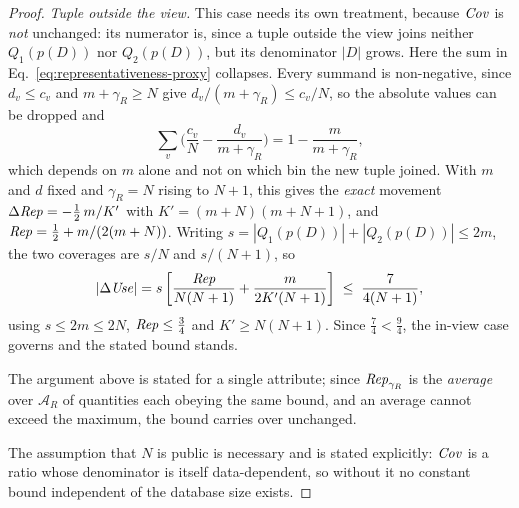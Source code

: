 \begin{proof}
\emph{Tuple outside the view.} This case needs its own treatment, because $\mathit{Cov}$ is \emph{not} unchanged: its numerator is, since a tuple outside the view joins neither $Q_1(p(D))$ nor $Q_2(p(D))$, but its denominator $|D|$ grows.
Here the sum in Eq.~\eqref{eq:representativeness-proxy} collapses.
Every summand is non-negative, since $d_v\le c_v$ and $m+\gamma_R\ge N$ give $d_v/(m+\gamma_R)\le c_v/N$, so the absolute values can be dropped and
\[
\sum_v\Big(\frac{c_v}{N}-\frac{d_v}{m+\gamma_R}\Big)=1-\frac{m}{m+\gamma_R},
\]
which depends on $m$ alone and not on which bin the new tuple joined.
With $m$ and $d$ fixed and $\gamma_R=N$ rising to $N+1$, this gives the \emph{exact} movement $\Delta\mathit{Rep}=-\tfrac12\,m/K'$ with $K'=(m+N)(m+N+1)$, and $\mathit{Rep}=\tfrac12+m/(2(m+N))$.
Writing $s=|Q_1(p(D))|+|Q_2(p(D))|\le 2m$, the two coverages are $s/N$ and $s/(N+1)$, so
\[
|\Delta\mathit{Use}| = s\left[\frac{\mathit{Rep}}{N(N+1)}+\frac{m}{2K'(N+1)}\right]
\;\le\;\frac{7}{4(N+1)},
\]
using $s\le2m\le2N$, $\mathit{Rep}\le\tfrac34$ and $K'\ge N(N+1)$.
Since $\tfrac74<\tfrac94$, the in-view case governs and the stated bound stands.

The argument above is stated for a single attribute; since $\mathit{Rep}_{\gamma_R}$ is the \emph{average} over $\mathcal{A}_R$ of quantities each obeying the same bound, and an average cannot exceed the maximum, the bound carries over unchanged.

The assumption that $N$ is public is necessary and is stated explicitly: $\mathit{Cov}$ is a ratio whose denominator is itself data-dependent, so without it no constant bound independent of the database size exists.
\end{proof}

